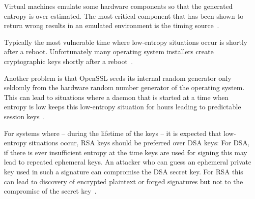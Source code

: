 Virtual machines emulate some hardware components so that the
generated entropy is over-estimated. The most critical component that
has been shown to return wrong results in an emulated environment is the
timing source~\cite{Eng11,POL11}.

Typically the most vulnerable time where low-entropy situations occur is
shortly after a reboot. Unfortunately many operating system installers
create cryptographic keys shortly after a reboot~\cite{HDWH12}.

Another problem is that OpenSSL seeds its internal random generator only
seldomly from the hardware random number generator of the operating
system. This can lead to situations where a daemon that is started at a
time when entropy is low keeps this low-entropy situation for hours
leading to predictable session keys~\cite{HDWH12}.

For systems where -- during the lifetime of the keys -- it is expected
that low-entropy situations occur, RSA keys should be preferred over DSA
keys: For DSA, if there is ever insufficient entropy at the time keys
are used for signing this may lead to repeated ephemeral keys. An
attacker who can guess an ephemeral private key used in such a signature
can compromise the DSA secret key.
For RSA this can lead to discovery of encrypted plaintext or forged
signatures but not to the compromise of the secret key~\cite{HDWH12}.
